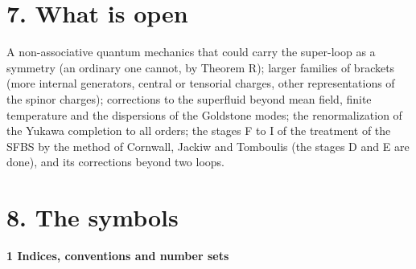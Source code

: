 \documentclass[
  10pt,
]{article}
\begin{document}
\hypertarget{what-is-open}{%
\section{7. What is open}\label{what-is-open}}

A non-associative quantum mechanics that could carry the super-loop as a
symmetry (an ordinary one cannot, by Theorem R); larger families of
brackets (more internal generators, central or tensorial charges, other
representations of the spinor charges); corrections to the superfluid
beyond mean field, finite temperature and the dispersions of the
Goldstone modes; the renormalization of the Yukawa completion to all
orders; the stages F to I of the treatment of the SFBS by the method of
Cornwall, Jackiw and Tomboulis (the stages D and E are done), and its
corrections beyond two loops.

\hypertarget{the-symbols}{%
\section{8. The symbols}\label{the-symbols}}

\textbf{1 Indices, conventions and number sets}
\end{document}
